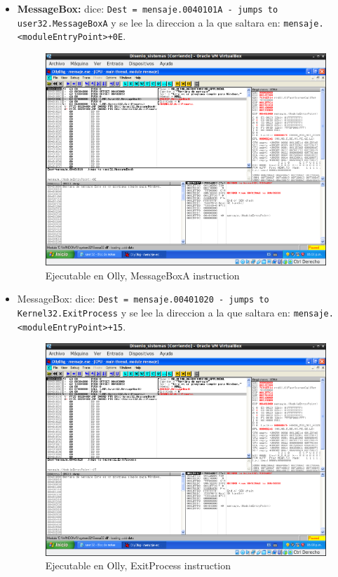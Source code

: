 \begin{itemize}
    \item \textbf{MessageBox:} dice: \verb|Dest = mensaje.0040101A - jumps to user32.MessageBoxA| y se lee la direccion a la que saltara en: \verb|mensaje.<moduleEntryPoint>+0E|.
    \begin{figure}[H]
      \includegraphics[width=\linewidth, scale=0.9]{practica3/imagenes/actividad3/message.png}
        \caption{Ejecutable en Olly, MessageBoxA instruction}
    \end{figure}

\item MessageBox: dice: \verb|Dest = mensaje.00401020 - jumps to Kernel32.ExitProcess| y se lee la direccion a la que saltara en: \verb|mensaje.<moduleEntryPoint>+15|.
    \begin{figure}[H]
      \includegraphics[width=\linewidth, scale=0.9]{practica3/imagenes/actividad3/exit.png}
      \caption{Ejecutable en Olly, ExitProcess instruction}
    \end{figure}
    \end{itemize}

